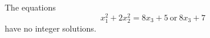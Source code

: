 \begin{proposition}
    The equations
\[
    x_1^2+2x_2^2=8x_3+5\ \text{or}\ 8x_3+7
\]
    have no integer solutions.
\end{proposition}
